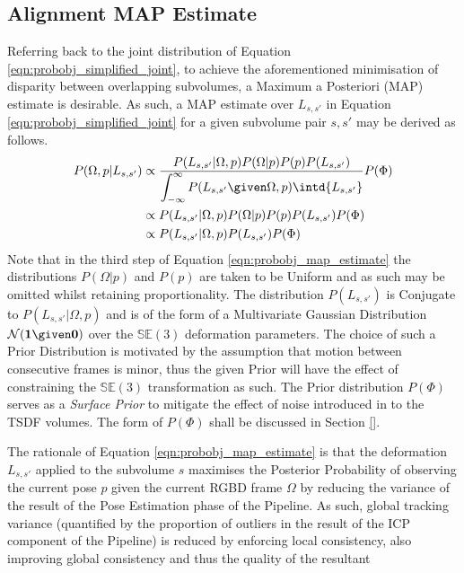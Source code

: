 \subsection{Alignment MAP Estimate}
\label{subsec:probobj_alignment_map}
Referring back to the joint distribution of Equation
\ref{eqn:probobj_simplified_joint}, to achieve the aforementioned minimisation
of disparity between overlapping subvolumes, a Maximum a Posteriori (MAP)
estimate is desirable. As such, a MAP estimate over $L_{s, s'}$ in Equation
\ref{eqn:probobj_simplified_joint} for a given subvolume pair $s, s'$ may be
derived as follows.
\begin{equation}
  \label{eqn:probobj_map_estimate}
  \begin{split}
    P(\Omega, p | L_{s, s'}) & \propto \frac{P(L_{s, s'} | \Omega, p) 
    P(\Omega | p)P(p)P(L_{s, s'})}
    {\displaystyle\int_{-\infty}^{\infty} P(L_{s, s'} \given \Omega, p)
    \intd{L_{s, s'}}} P(\Phi) \\
    & \propto P(L_{s, s'} | \Omega, p) P(\Omega | p)P(p)P(L_{s, s'})P(\Phi) \\
    & \propto P(L_{s, s'} | \Omega, p)P(L_{s, s'})P(\Phi)
  \end{split}
\end{equation}
Note that in the third step of Equation \ref{eqn:probobj_map_estimate} the
distributions $P(\Omega | p)$ and $P(p)$ are taken to be Uniform and as such may
be omitted whilst retaining proportionality. The distribution $P(L_{s, s'})$ is
Conjugate to $P(L_{s, s'} | \Omega, p)$ and is of the form of a Multivariate
Gaussian Distribution $\mathcal{N}(\mathbf{1} \given \mathbf{0})$ over the
$\mathbb{SE}(3)$ deformation parameters. The choice of such a Prior Distribution
is motivated by the assumption that motion between consecutive frames is minor,
thus the given Prior will have the effect of constraining the $\mathbb{SE}(3)$
transformation as such. The Prior distribution $P(\Phi)$ serves as a
\textit{Surface Prior} to mitigate the effect of noise introduced in to the TSDF
volumes. The form of $P(\Phi)$ shall be discussed in Section \ref{}.

The rationale of Equation \ref{eqn:probobj_map_estimate} is that the deformation
$L_{s, s'}$ applied to the subvolume $s$ maximises the Posterior Probability of
observing the current pose $p$ given the current RGBD frame $\Omega$ by reducing
the variance of the result of the Pose Estimation phase of the Pipeline. As such,
global tracking variance (quantified by the proportion of outliers in the result
of the ICP component of the Pipeline) is reduced by enforcing local consistency,
also improving global consistency and thus the quality of the resultant

